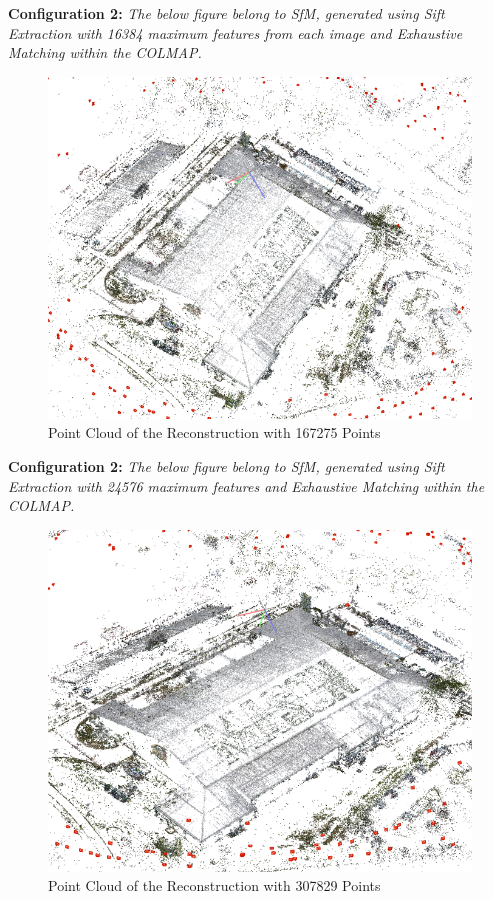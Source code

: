 \documentclass[sigconf]{acmart}
\begin{document}
\textbf{Configuration 2: }
\textit{The below figure belong to SfM, generated using Sift Extraction with 16384 maximum features from each image and Exhaustive Matching within the COLMAP.}

\begin{figure}[H]
  \centering
  \includegraphics[width=\linewidth]{images/results/sfm_sift_16384.png}
  \caption{Point Cloud of the Reconstruction with 167275 Points}
  \label{fig:sift_basic}
\end{figure}

\textbf{Configuration 2: }
\textit{The below figure belong to SfM, generated using Sift Extraction with 24576 maximum features and Exhaustive Matching within the COLMAP.}

\begin{figure}[H]
  \centering
  \includegraphics[width=\linewidth]{images/results/sfm_sift_24576.png}
  \caption{Point Cloud of the Reconstruction with 307829 Points}
  \label{fig:sift_more}
\end{figure}
\end{document}
